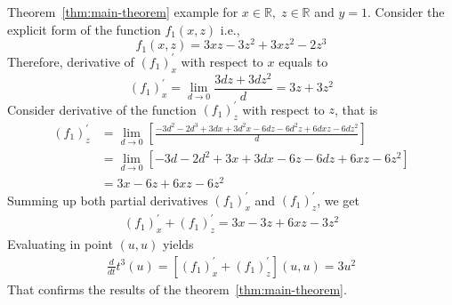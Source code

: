 \begin{example}
    \normalfont
    Theorem~\ref{thm:main-theorem} example for $x\in\mathbb{R}, \; z\in \mathbb{R}$ and $y=1$.
    Consider the explicit form of the function $f_{1} (x, z)$ i.e.,
    \[
        f_1(x, z) = 3 x z - 3 z^2 + 3 x z^2 - 2 z^3
    \]
    Therefore, derivative of $(f_1)^{'}_{x}$ with respect to $x$ equals to
    \[
        (f_1)^{'}_{x} = \lim_{d \to 0} \frac{3 d z + 3 d z^2}{d} = 3 z + 3 z^2
    \]
    Consider derivative of the function $(f_1) ^{'}_{z}$ with respect to $z$, that is
    \begin{align*}
    (f_1) ^{'}_{z}
        &= \lim_{d \to 0} \left[\frac{-3 d^2 - 2 d^3 + 3 d x + 3 d^2 x - 6 d z - 6 d^2 z + 6 d x z - 6 d z^2}{d} \right] \\
        &= \lim_{d \to 0} \left[ -3 d - 2 d^2 + 3 x + 3 d x - 6 z - 6 d z + 6 x z - 6 z^2 \right] \\
        &=3 x - 6 z + 6 x z - 6 z^2
    \end{align*}
    Summing up both partial derivatives $(f_1)^{'}_{x}$ and $(f_1)^{'}_{z}$, we get
    \begin{align*}
    (f_1)
        ^{'}_{x} + (f_1)^{'}_{z} = 3 x - 3 z + 6 x z - 3 z^2
    \end{align*}
    Evaluating in point $(u, u)$ yields
    \begin{align*}
        \frac{d}{dt} t^{3} (u) = [(f_1)^{'}_{x} + (f_1)^{'}_{z}] (u,u)  = 3 u^2
    \end{align*}
    That confirms the results of the theorem~\ref{thm:main-theorem}.
\end{example}